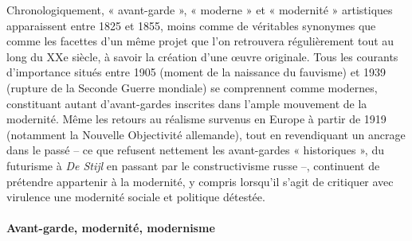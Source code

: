 Chronologiquement, « avant-garde », « moderne » et « modernité » artistiques apparaissent entre 1825 et 1855, moins comme de véritables synonymes que comme les facettes d'un même projet que l'on retrouvera régulièrement tout au long du XXe siècle, à savoir la création d'une œuvre originale. Tous les courants d'importance situés entre 1905 (moment
de la naissance du fauvisme) et 1939 (rupture de la Seconde Guerre mondiale) se comprennent comme modernes, constituant autant d'avant-gardes inscrites dans l'ample mouvement de la modernité. Même les retours au réalisme survenus en Europe à partir de 1919 (notamment la Nouvelle Objectivité allemande), tout en revendiquant un ancrage dans le passé – ce que refusent nettement les avant-gardes « historiques », du futurisme à \textit{De Stijl}
en passant par le constructivisme russe –, continuent de prétendre appartenir à la modernité, y compris lorsqu'il s'agit de critiquer avec virulence une modernité sociale et politique détestée.

\paragraph{Avant-garde, modernité, modernisme}


